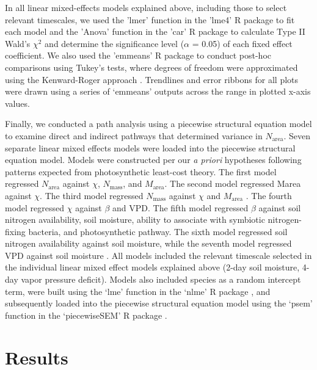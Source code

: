 In all linear mixed-effects models explained above, including those to select relevant timescales, we used the 'lmer' function in the 'lme4' R package  to fit each model and the 'Anova' function in the 'car' R package  to calculate Type II Wald's $\chi^2$ and determine the significance level ($\alpha$ = 0.05) of each fixed effect coefficient. We also used the 'emmeans' R package  to conduct post-hoc comparisons using Tukey's tests, where degrees of freedom were approximated using the Kenward-Roger approach . Trendlines and error ribbons for all plots were drawn using a series of ‘emmeans’ outputs across the range in plotted x-axis values.

Finally, we conducted a path analysis using a piecewise structural equation model to examine direct and indirect pathways that determined variance in $N_\mathrm{area}$. Seven separate linear mixed effects models were loaded into the piecewise structural equation model. Models were constructed per our \textit{a priori} hypotheses following patterns expected from photosynthetic least-cost theory. The first model regressed $N_\mathrm{area}$ against $\chi$, $N_\mathrm{mass}$, and $M_\mathrm{area}$. The second model regressed Marea against $\chi$. The third model regressed $N_\mathrm{mass}$ against $\chi$ and $M_\mathrm{area}$ . The fourth model regressed $\chi$ against $\beta$ and VPD. The fifth model regressed $\beta$ against soil nitrogen availability, soil moisture, ability to associate with symbiotic nitrogen-fixing bacteria, and photosynthetic pathway. The sixth model regressed soil nitrogen availability against soil moisture, while the seventh model regressed VPD against soil moisture . All models included the relevant timescale selected in the individual linear mixed effect models explained above (2-day soil moisture, 4-day vapor pressure deficit). Models also included species as a random intercept term, were built using the ‘lme’ function in the ‘nlme’ R package , and subsequently loaded into the piecewise structural equation model using the ‘psem’ function in the ‘piecewiseSEM’ R package .

\section{Results}
